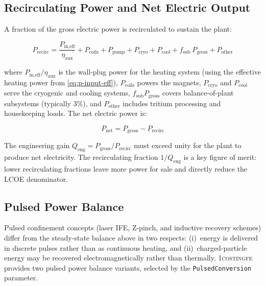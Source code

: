 \documentclass{article}
\begin{document}
\subsection{Recirculating Power and Net Electric Output}

A fraction of the gross electric power is recirculated to sustain
the plant:

\begin{equation}
\label{eq:p-recirc}
P_{\text{recirc}} = \frac{P_{\text{in,eff}}}{\eta_{\text{aux}}}
  + P_{\text{coils}} + P_{\text{pump}} + P_{\text{cryo}}
  + P_{\text{cool}} + f_{\text{sub}} \, P_{\text{gross}}
  + P_{\text{other}}
\end{equation}

\noindent where $P_{\text{in,eff}}/\eta_{\text{aux}}$ is the wall-plug
power for the heating system (using the effective heating power from
\cref{eq:p-input-eff}), $P_{\text{coils}}$ powers the magnets,
$P_{\text{cryo}}$ and $P_{\text{cool}}$ serve the cryogenic and cooling
systems, $f_{\text{sub}} P_{\text{gross}}$ covers balance-of-plant
subsystems (typically 3\%), and $P_{\text{other}}$ includes tritium
processing and housekeeping loads. The net electric power is:

\begin{equation}
\label{eq:p-net}
P_{\text{net}} = P_{\text{gross}} - P_{\text{recirc}}
\end{equation}

\noindent The engineering gain $Q_{\text{eng}} = P_{\text{gross}} /
P_{\text{recirc}}$ must exceed unity for the plant to produce net
electricity. The recirculating fraction
$1/Q_{\text{eng}}$ is a key figure of merit: lower recirculating
fractions leave more power for sale and directly reduce the LCOE
denominator.

\subsection{Pulsed Power Balance}
\label{sec:pulsed-balance}

Pulsed confinement concepts (laser IFE, Z-pinch, and inductive
recovery schemes) differ from the steady-state balance above in two
respects: (i)~energy is delivered in discrete pulses rather than as
continuous heating, and (ii)~charged-particle energy may be recovered
electromagnetically rather than thermally. \textsc{1costingfe}
provides two pulsed power balance variants, selected by the
\texttt{PulsedConversion} parameter.
\end{document}
